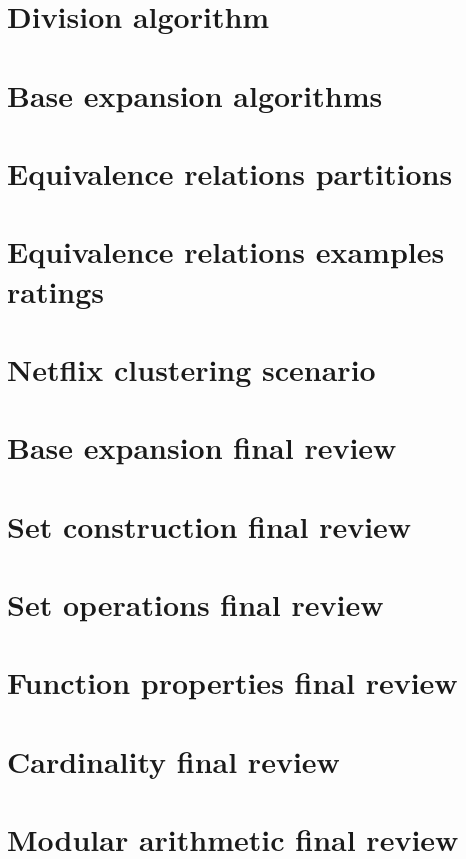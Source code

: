 \section*{Division algorithm}

\vfill
\section*{Base expansion algorithms}

\vfill
\section*{Equivalence relations partitions}

\vfill
\section*{Equivalence relations examples ratings}

\vfill
\section*{Netflix clustering scenario}

\vfill
\section*{Base expansion final review}

\vfill
\section*{Set construction final review}

\vfill
\section*{Set operations final review}

\vfill
\section*{Function properties final review}

\vfill
\section*{Cardinality final review}

\vfill
\section*{Modular arithmetic final review}

\vfill
